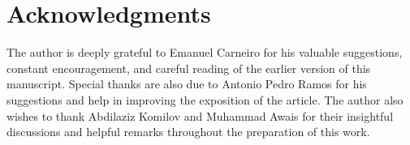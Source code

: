 \documentclass[reqno, a4paper]{amsart}
\theoremstyle{plain}
\theoremstyle{definition}
\theoremstyle{remarkstyle}
\numberwithin{equation}{section}
\begin{document}
\section*{Acknowledgments}
The author is deeply grateful to Emanuel Carneiro for his valuable suggestions, constant encouragement, and careful reading of the earlier version of this manuscript. Special thanks are also due to Antonio Pedro Ramos for his suggestions and help in improving the exposition of the article. The author also wishes to thank Abdilaziz Komilov and Muhammad Awais for their insightful discussions and helpful remarks throughout the preparation of this work.




\end{document}
